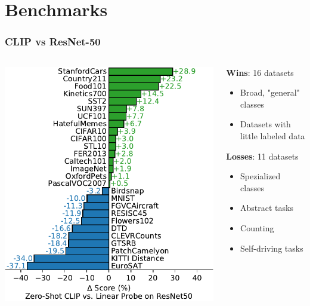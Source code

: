 \section{Benchmarks}
\begin{frame}
    \frametitle{CLIP vs ResNet-50}
    \begin{columns}[T]
        \begin{column}{0.35\textwidth}
            \includegraphics[width=\textwidth]{./images/zs-clip-vs-rn50}
        \end{column}
        \pause
        \begin{column}{0.65\textwidth}
            \textbf{Wins}: 16 datasets
            \begin{itemize}
                \item Broad, "general" classes
                \item Datasets with little labeled data
            \end{itemize}

            \pause

            \textbf{Losses}: 11 datasets
            \begin{itemize}
                \item Spezialized classes
                \item Abstract tasks
                \item Counting
                \item Self-driving tasks
            \end{itemize}
        \end{column}
    \end{columns}
\end{frame}

